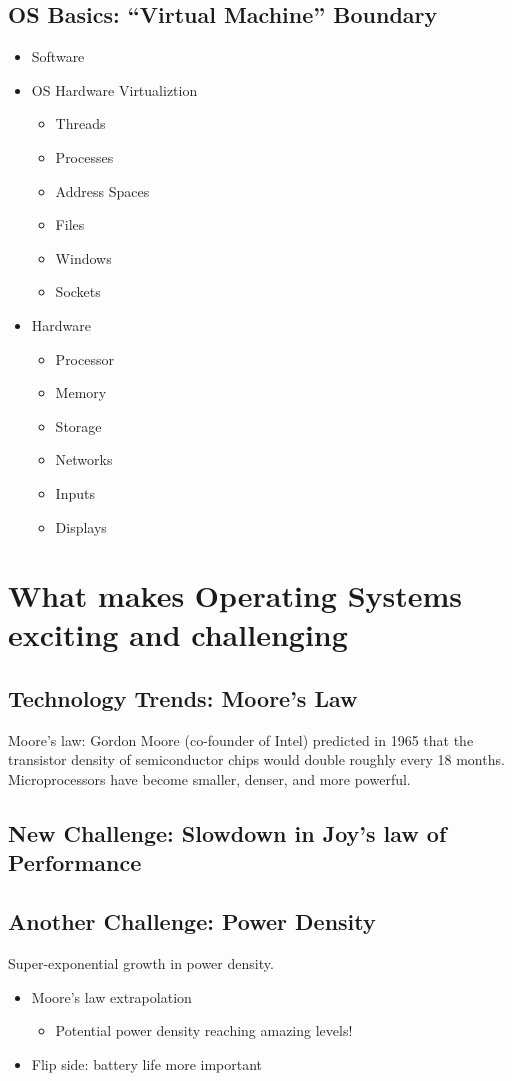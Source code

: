 \documentclass{article}
\begin{document}
\subsection{OS Basics: ``Virtual Machine'' Boundary}
\begin{itemize}
\item Software
\item OS Hardware Virtualiztion
\begin{itemize}
\item Threads
\item Processes
\item Address Spaces
\item Files
\item Windows
\item Sockets
\end{itemize}
\item Hardware
\begin{itemize}
\item Processor
\item Memory
\item Storage
\item Networks
\item Inputs
\item Displays
\end{itemize}
\end{itemize}
\section{What makes Operating Systems exciting and challenging}
\subsection{Technology Trends: Moore's Law}
Moore's law: Gordon Moore (co-founder of Intel) predicted in 1965 that the transistor density of semiconductor chips would double roughly every 18 months.  Microprocessors have become smaller, denser, and more powerful.
\subsection{New Challenge: Slowdown in Joy's law of Performance}
\subsection{Another Challenge: Power Density}
Super-exponential growth in power density.
\begin{itemize}
\item Moore's law extrapolation
\begin{itemize}
\item Potential power density reaching amazing levels!
\end{itemize}
\item Flip side: battery life more important
\end{itemize}
\end{document}
